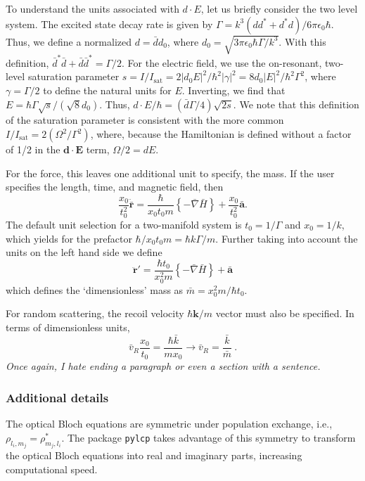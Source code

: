 \documentclass[final,5p,times,twocolumn]{elsarticle}
\newcounter{bla}
\begin{document}
To understand the units associated with $d\cdot E$, let us briefly consider the two level system.  The excited state decay rate is given by $\Gamma = k^3(d d^*+d^* d)/6 \pi\epsilon_0\hbar$.  Thus, we define a normalized $d=\bar{d} d_0$, where $d_0 = \sqrt{3 \pi \epsilon_0 \hbar \Gamma/k^3}$.  With this definition, $\bar{d}^*\bar{d}+\bar{d}\bar{d}^* = \Gamma/2$.  For the electric field, we use the on-resonant, two-level saturation parameter $s = I/I_\text{sat} = 2|d_0 E|^2/\hbar^2|\gamma|^2 = 8 d_0 |E|^2/\hbar^2\Gamma^2$, where $\gamma = \Gamma/2$ to define the natural units for $E$.  Inverting, we find that $E = \hbar \Gamma \sqrt{s}/(\sqrt{8} d_0)$.  Thus, $d\cdot E/\hbar = (\bar{d} \Gamma/4) \sqrt{2 s}$.  We note that this definition of the saturation parameter is consistent with the more common $I/I_\text{sat} = 2(\Omega^2/\Gamma^2)$, where, because the Hamiltonian is defined without a factor of 1/2 in the $\mathbf{d}\cdot \mathbf{E}$ term, $\Omega/2=dE$.

For the force, this leaves one additional unit to specify, the mass.  If the
user specifies the length, time, and magnetic field, then
\begin{equation}
    \frac{x_0}{t_0^2} \ddot{\bar{\mathbf{r}}} = \frac{\hbar}{x_0 t_0 m}\left\{ -\bar{\nabla} \bar{H}\right\} + \frac{x_0}{t_0^2}\bar{\mathbf{a}}.
\end{equation}
The default unit selection for a two-manifold system is $t_0=1/\Gamma$ and $x_0=1/k$, which yields for the prefactor $\hbar/x_0 t_0 m = \hbar k \Gamma/m$.   Further taking into account the units on the left hand side we define
\begin{equation}
	\ddot{\mathbf{r}}' = \frac{\hbar t_0}{x_0^2 m}\left\{ -\bar{\nabla} \bar{H}\right\} + \bar{\mathbf{a}}
\end{equation}
which defines the `dimensionless' mass as $\bar{m} = x_0^2 m/\hbar t_0$.

For random scattering, the recoil velocity $\hbar \mathbf{k}/m$ vector must also be specified.  In terms of dimensionless units,
\begin{equation}
	\bar{v}_R \frac{x_0}{t_0} = \frac{\hbar\bar{k}}{m x_0} \rightarrow \bar{v}_R = \frac{\bar{k}}{\bar{m}}\ .
\end{equation}
{\it Once again, I hate ending a paragraph or even a section with a sentence.}

\subsubsection{Additional details}
The optical Bloch equations are symmetric under population exchange, i.e., $\rho_{l_i, m_j} = \rho^*_{m_j, l_i}$.  The package {\tt pylcp} takes advantage of this symmetry to transform the optical Bloch equations into real and imaginary parts, increasing computational speed.
\end{document}
